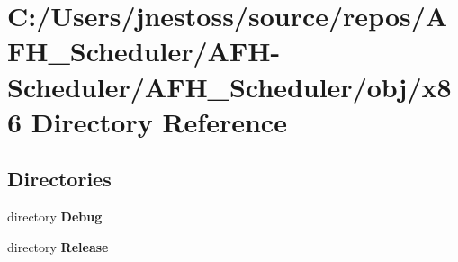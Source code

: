 \section{C\+:/\+Users/jnestoss/source/repos/\+A\+F\+H\+\_\+\+Scheduler/\+A\+F\+H-\/\+Scheduler/\+A\+F\+H\+\_\+\+Scheduler/obj/x86 Directory Reference}
\label{dir_4dab75d869493532a2de1dc2efdd0b7b}
\subsection*{Directories}
\begin{DoxyCompactItemize}
\item 
directory \textbf{ Debug}
\item 
directory \textbf{ Release}
\end{DoxyCompactItemize}
